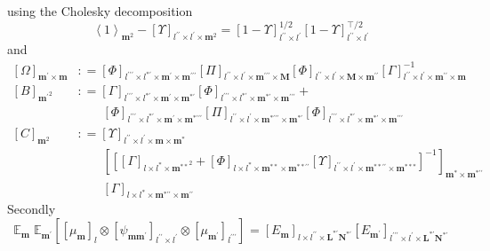 \documentclass[preprint,12pt]{elsarticle}
\newcommand*{\M}[1]{\ensuremath{#1}\xspace}
\newcommand*{\x}{\times}
\newcommand*{\mi}[1]{\mathbf{#1}}
\newcommand*{\te}[2][]{\left\lbrack{#2}\right\rbrack_{#1}}
\newcommand*{\diag}[2][]{\left\langle{#2}\right\rangle_{#1}}
\newcommand*{\deq}{\M{\mathrel{\mathop:}=}}
\newcommand*{\evt}[3][]{\mathbb{E}_{#3}^{#1}\!#2}
\begin{document}
        using the Cholesky decomposition
        \begin{equation*}
            \diag[\mi{m}^{2}]{1} - \te[l^{\prime\prime}\x l^{\prime}\x\mi{m}^{2}]{\Upsilon}
            = \te[l^{\prime\prime}\x l^{\prime}]{1-\Upsilon}^{1/2} \te[l^{\prime\prime}\x l^{\prime}]{1-\Upsilon}^{\intercal/2}
        \end{equation*}
        and
        \begin{equation*}
            \begin{aligned}
                \te[\mi{m^{\prime}\x m}]{\Omega} &\deq 
                \te[l^{\prime\prime\prime}\x l^{*\prime}\x\mi{m^{\prime}}\x\mi{m^{\prime\prime\prime}}]{\Phi}
                \te[l^{\prime\prime}\x l^{\prime}\x\mi{m^{\prime\prime\prime}}\x\mi{M}]{\Pi}
                \te[l^{\prime\prime}\x l^{\prime}\x\mi{M}\x\mi{m^{\prime\prime}}]{\Phi}
                \te[l^{\prime\prime}\x l^{\prime}\x\mi{m^{\prime\prime}}\x\mi{m}]{\Gamma}^{-1} \\
                \te[\mi{m^{\prime}}^{2}]{B} &\deq 
                \te[l^{\prime\prime\prime}\x l^{*\prime}\x\mi{m^{\prime}}\x\mi{m^{*\prime}}]{\Gamma}
                \te[l^{\prime\prime\prime}\x l^{*\prime}\x\mi{m^{*\prime}}\x\mi{m^{\prime\prime\prime}}]{\Phi} + \\
                &\phantom{\deq\ }\te[l^{\prime\prime\prime}\x l^{*\prime}\x\mi{m^{\prime}}\x\mi{m^{*\prime\prime\prime}}]{\Phi}
                \te[l^{\prime\prime}\x l^{\prime}\x\mi{m^{*\prime\prime\prime}}\x\mi{m^{*\prime}}]{\Pi}
                \te[l^{\prime\prime\prime}\x l^{*\prime}\x\mi{m^{*\prime}}\x\mi{m^{\prime\prime\prime}}]{\Phi} \\
                \te[\mi{m}^{2}]{C} &\deq 
                \te[l^{\prime\prime}\x l^{\prime}\x\mi{m}\x\mi{m^{*}}]{\Upsilon} \\
                &\phantom{\deq\ }
                \te[\mi{m^{*}}\x\mi{m^{*\prime\prime}}]{\te[]{\te[l\x l^{*}\x\mi{m^{**}}^{2}]{\Gamma}
                + \te[l\x l^{*}\x\mi{m^{**}}\x\mi{m^{**\prime\prime}}]{\Phi}\te[l^{\prime\prime}\x l^{\prime}\x\mi{m^{**\prime\prime}}\x\mi{m^{***}}]{\Upsilon}}^{-1}} \\
                &\phantom{\deq\ }\te[l\x l^{*}\x\mi{m^{*\prime\prime}}\x\mi{m^{\prime\prime}}]{\Gamma}
            \end{aligned}
        \end{equation*}
        Secondly
        \begin{equation*}
            \evt{\;\evt{\te[]{\te[l]{\mu_{\mi{m}}} \otimes \te[l^{\prime\prime}\x l^{\prime}]{\psi_{\mi{mm^{\prime}}}} \otimes \te[l^{\prime\prime\prime}]{\mu_{\mi{m^{\prime}}}}}}{\mi{m^{\prime}}}}{\mi{m}} = 
            \te[l\x l^{\prime\prime}\x \mi{L^{*\prime}N^{*\prime}}]{E_{\mi{m}}}
            \te[l^{\prime\prime\prime}\x l^{\prime}\x \mi{L^{*\prime}N^{*\prime}}]{E_{\mi{m^{\prime}}}}
        \end{equation*}
\end{document}
